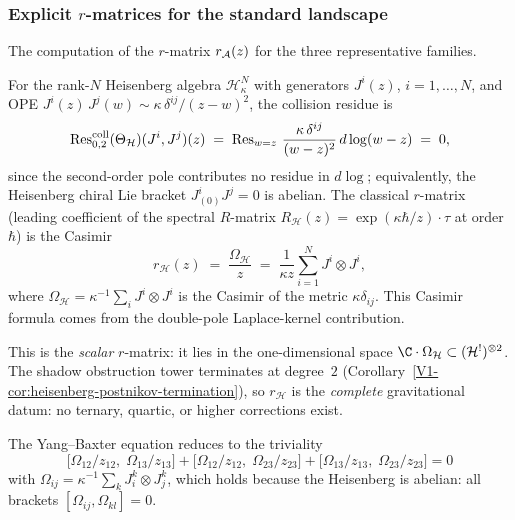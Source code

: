 \subsubsection{Explicit $r$-matrices for the standard landscape}

The computation of the $r$-matrix $r_{\mathcal{A}}(z)$ for the three
representative families.

\begin{computation}
For the rank-$N$ Heisenberg algebra
$\mathcal{H}^N_\kappa$ with generators $J^i(z)$,
$i = 1,\dotsc,N$, and OPE
$J^i(z)\,J^j(w) \sim \kappa\,\delta^{ij}/(z-w)^2$, the collision
residue is
\begin{equation}%
\Rescoll_{0,2}(\Theta_{\mathcal{H}})
 (J^i, J^j)(z)
\;=\;
\Res_{w=z}\,
\frac{\kappa\,\delta^{ij}}{(w-z)^2}\,d\log(w-z)
\;=\;
0,
\end{equation}
since the second-order pole contributes no residue in $d\log$;
equivalently, the Heisenberg chiral Lie bracket $J^i_{(0)}J^j = 0$
is abelian.
The classical $r$-matrix (leading coefficient of the spectral
$R$-matrix $R_{\mathcal{H}}(z) = \exp(\kappa\hbar/z)\cdot\tau$
at order $\hbar$) is the Casimir
\begin{equation}%
r_{\mathcal{H}}(z)
\;=\;
\frac{\Omega_{\mathcal{H}}}{z}
\;=\;
\frac{1}{\kappa z}
\sum_{i=1}^N
J^i \otimes J^i,
\end{equation}
where $\Omega_{\mathcal{H}} = \kappa^{-1}\sum_i J^i\otimes J^i$ is the
Casimir of the metric $\kappa\delta_{ij}$. This Casimir formula
comes from the double-pole Laplace-kernel contribution.

This is the \emph{scalar} $r$-matrix: it lies in the one-dimensional
space $\C \cdot \Omega_{\mathcal{H}} \subset
(\mathcal{H}^!)^{\otimes 2}$. The shadow obstruction tower terminates at
degree~$2$ (Corollary~\ref{V1-cor:heisenberg-postnikov-termination}),
so $r_{\mathcal{H}}$ is the \emph{complete} gravitational datum:
no ternary, quartic, or higher corrections exist.

The Yang--Baxter equation reduces to the triviality
\begin{equation}%
\bigl[\Omega_{12}/z_{12},\;\Omega_{13}/z_{13}\bigr]
+
\bigl[\Omega_{12}/z_{12},\;\Omega_{23}/z_{23}\bigr]
+
\bigl[\Omega_{13}/z_{13},\;\Omega_{23}/z_{23}\bigr]
= 0
\end{equation}
with $\Omega_{ij} = \kappa^{-1}\sum_k J^k_i \otimes J^k_j$, which
holds because the Heisenberg is abelian: all brackets
$[\Omega_{ij}, \Omega_{kl}] = 0$.
\end{computation}

